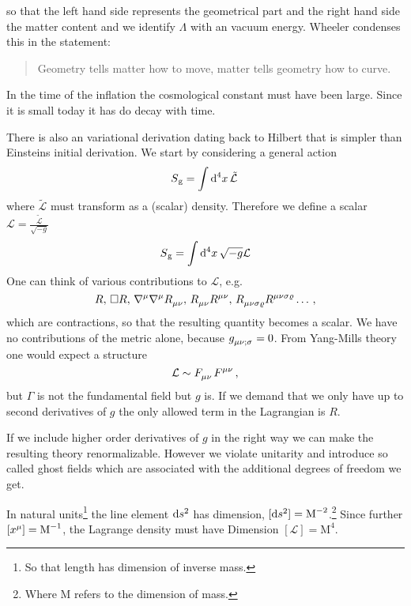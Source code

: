 so that the left hand side represents the geometrical part and the right hand
side the matter content and we identify $\Lambda$ with an vacuum energy.
Wheeler condenses this in the statement:
\begin{quote}
Geometry tells matter how to move, matter tells geometry how to
curve.
\end{quote}
\begin{sidenote}
In the time of the inflation the cosmological constant must have been large.
Since it is small today it has do decay with time.
\end{sidenote}
There is also an variational derivation dating back to Hilbert that is
simpler than Einsteins initial derivation. We start by considering a general action
\begin{equation}
S\textsubscript{g}=\fourint  \tilde{\mathcal{L}}\, 
\end{equation}
where $\tilde{\mathcal{L}}$ must transform as a (scalar) density. Therefore we
define a scalar $\mathcal{L}=\frac{\tilde{\mathcal{L}}}{\sqrt{-g}}$
\begin{equation}
S\textsubscript{g}=\fourint \sqrt{-g}\mathcal{L}
\end{equation}
One can think of various contributions to $\mathcal{L}$, e.g.
\begin{equation*}
R,\, \square
R,\,\tensor{\nabla}{^\mu}\tensor{\nabla}{^\mu}\tensor{R}{_\mu_\nu},\,
\tensor{R}{_\mu_\nu}\tensor{R}{^\mu^\nu}
,\,\tensor{R}{_\mu_\nu_\sigma_\varrho}\tensor{R}{^\mu^\nu^\sigma^\varrho}\dots\,,
\end{equation*}
which are contractions, so that the resulting quantity becomes a scalar.
We have no contributions of the metric alone, because
$\tensor{g}{_\mu_\nu_{;\sigma}}=0$. From Yang-Mills theory one would expect a
structure
\begin{equation}
\mathcal{L}\sim\tensor{F}{_\mu_\nu}\tensor{F}{^\mu^\nu}\,,
\end{equation}
but $\Gamma$ is not the fundamental field but $g$ is. If we demand that we only
have up to second derivatives of $g$ the only allowed term in the Lagrangian is
$R$.
\begin{sidenote}
If we include higher order derivatives of $g$ in the right way we can make the
resulting theory renormalizable. However we violate unitarity and introduce so
called ghost fields which are associated with the additional degrees of freedom
we get.
\end{sidenote}
\begin{remark}[Dimensions]
In natural units\footnote{So that length has dimension of inverse mass.} the
line element $\dif s^2$ has dimension, ${[\dif
s^2]=\textrm{M}^{-2}}$.\footnote{Where M refers to the dimension of mass.} 
Since further ${\left[\tensor{x}{^\mu}\right]=\textrm{M}^{-1}}$,
the Lagrange density must have Dimension
${\left[\mathcal{L}\right]=\textrm{M}^{4}}$.
\end{remark}
